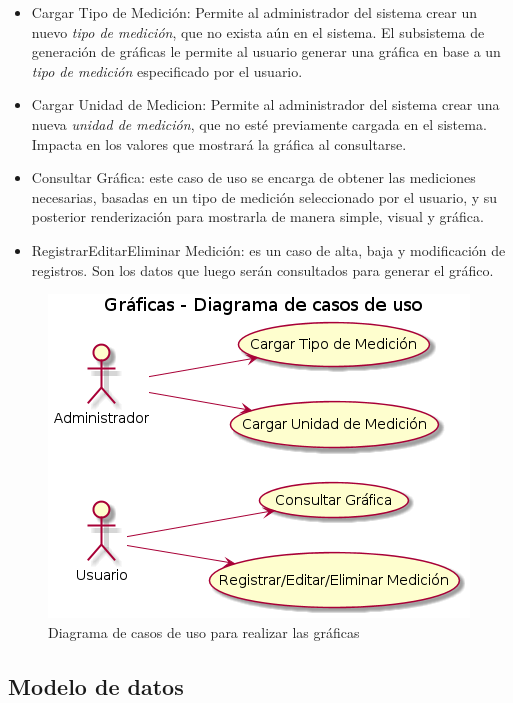 \begin{itemize}
	\item Cargar Tipo de Medición: Permite al administrador del sistema crear un nuevo \textit{tipo de medición}, que no exista aún en el sistema. El subsistema de generación de gráficas le permite al usuario generar una gráfica en base a un \textit{tipo de medición} especificado por el usuario.
	
	\item Cargar Unidad de Medicion: Permite al administrador del sistema crear una nueva \textit{unidad de medición}, que no esté previamente cargada en el sistema. Impacta en los valores que mostrará la gráfica al consultarse.
	
	\item Consultar Gráfica: este caso de uso se encarga de obtener las mediciones necesarias, basadas en un tipo de medición seleccionado por el usuario, y su posterior renderización para mostrarla de manera simple, visual y gráfica.
	
	\item Registrar\/Editar\/Eliminar Medición: es un caso de alta, baja y modificación de registros. Son los datos que luego serán consultados para generar el gráfico.
	
\end{itemize}

\begin{figure}[h!]
	\centering
	\includegraphics[width=.8\textwidth]{img/5-cu-graficas}
	\caption{Diagrama de casos de uso para realizar las gráficas}
	\label{5-cu-graficas}
\end{figure}


\subsection{Modelo de datos} 

